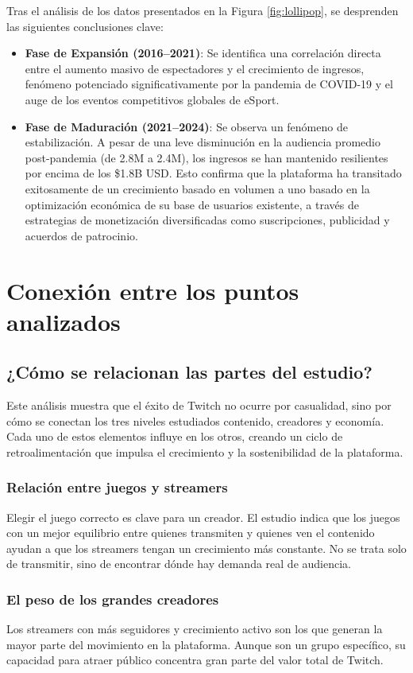 \documentclass[12pt,a4paper]{article}
\begin{document}
Tras el análisis de los datos presentados en la Figura \ref{fig:lollipop}, se desprenden las siguientes conclusiones clave:

\begin{itemize}
    \item \textbf{Fase de Expansión (2016--2021)}: Se identifica una correlación directa entre el aumento masivo de espectadores y el crecimiento de ingresos, fenómeno potenciado significativamente por la pandemia de COVID-19 y el auge de los eventos competitivos globales de eSport.
    \item \textbf{Fase de Maduración (2021--2024)}: Se observa un fenómeno de estabilización. A pesar de una leve disminución en la audiencia promedio post-pandemia (de 2.8M a 2.4M), los ingresos se han mantenido resilientes por encima de los \$1.8B USD. Esto confirma que la plataforma ha transitado exitosamente de un crecimiento basado en volumen a uno basado en la optimización económica de su base de usuarios existente, a través de estrategias de monetización diversificadas como suscripciones, publicidad y acuerdos de patrocinio.
\end{itemize}
\newpage
\section{Conexión entre los puntos analizados}
\subsection{¿Cómo se relacionan las partes del estudio?} 

Este análisis muestra que el éxito de Twitch no ocurre por casualidad, sino por cómo se conectan los tres niveles estudiados contenido, creadores y economía. Cada uno de estos elementos influye en los otros, creando un ciclo de retroalimentación que impulsa el crecimiento y la sostenibilidad de la plataforma.

\subsubsection{Relación entre juegos y streamers} 
Elegir el juego correcto es clave para un creador. El estudio indica que los juegos con un mejor equilibrio entre quienes transmiten y quienes ven el contenido ayudan a que los streamers tengan un crecimiento más constante. No se trata solo de transmitir, sino de encontrar dónde hay demanda real de audiencia.

\subsubsection{El peso de los grandes creadores} 
Los streamers con más seguidores y crecimiento activo son los que generan la mayor parte del movimiento en la plataforma. Aunque son un grupo específico, su capacidad para atraer público concentra gran parte del valor total de Twitch.
\end{document}
